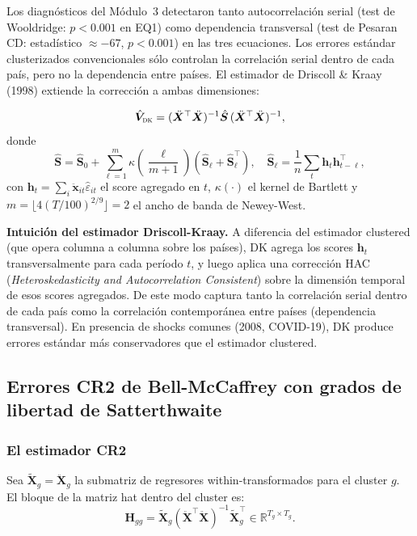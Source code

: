 \documentclass[12pt, a4paper]{article}
\theoremstyle{definition}
\newcommand{\R}{\mathbb{R}}
\begin{document}
Los diagnósticos del Módulo~3 detectaron tanto autocorrelación serial (test de Wooldridge: $p < 0.001$ en EQ1) como dependencia transversal (test de Pesaran CD: estadístico $\approx -67$, $p < 0.001$) en las tres ecuaciones. Los errores estándar clusterizados convencionales sólo controlan la correlación serial dentro de cada país, pero no la dependencia entre países. El estimador de Driscoll \& Kraay (1998) extiende la corrección a ambas dimensiones:

\[
  \hat{\bm{V}}_{\textsc{dk}} = (\ddot{\bm{X}}^\top\ddot{\bm{X}})^{-1}
  \hat{\bm{S}}\,
  (\ddot{\bm{X}}^\top\ddot{\bm{X}})^{-1},
\]
donde
\[
  \hat{\bm{S}} = \hat{\bm{S}}_0 + \sum_{\ell=1}^{m}\kappa\!\left(\frac{\ell}{m+1}\right)\left(\hat{\bm{S}}_\ell + \hat{\bm{S}}_\ell^\top\right),
  \quad
  \hat{\bm{S}}_\ell = \frac{1}{n}\sum_{t}\bm{h}_t\bm{h}_{t-\ell}^\top,
\]
con $\bm{h}_t = \sum_{i} \ddot{\bm{x}}_{it}\hat\varepsilon_{it}$ el score agregado en $t$, $\kappa(\cdot)$ el kernel de Bartlett y $m = \lfloor 4(T/100)^{2/9}\rfloor = 2$ el ancho de banda de Newey-West.

\begin{intuitionbox}
\textbf{Intuición del estimador Driscoll-Kraay.} A diferencia del estimador clustered (que opera columna a columna sobre los países), DK agrega los scores $\bm{h}_t$ transversalmente para cada período $t$, y luego aplica una corrección HAC (\textit{Heteroskedasticity and Autocorrelation Consistent}) sobre la dimensión temporal de esos scores agregados. De este modo captura tanto la correlación serial dentro de cada país como la correlación contemporánea entre países (dependencia transversal). En presencia de shocks comunes (2008, COVID-19), DK produce errores estándar más conservadores que el estimador clustered.
\end{intuitionbox}

\subsection{Errores CR2 de Bell-McCaffrey con grados de libertad de Satterthwaite}
\label{sec:cr2}

\subsubsection{El estimador CR2}

Sea $\tilde{\bm{X}}_g = \ddot{\bm{X}}_g$ la submatriz de regresores within-transformados para el cluster $g$. El bloque de la matriz hat dentro del cluster es:
\[
  \bm{H}_{gg} = \tilde{\bm{X}}_g (\ddot{\bm{X}}^\top\ddot{\bm{X}})^{-1} \tilde{\bm{X}}_g^\top \in \R^{T_g \times T_g}.
\]
\end{document}
